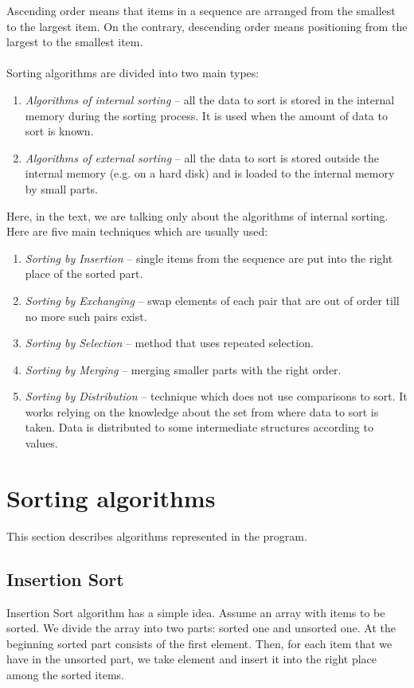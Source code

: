 \documentclass[
  field=inf,
  biblatex,
  language=english,
  glossaries,
  theorems=false,
  sourcecodes=false,
  index
]{kidiplom}
\begin{document}
Ascending order means that items in a sequence are arranged from the smallest to the largest item. On the contrary, descending order means positioning from the largest to the smallest item.
\\\\
Sorting algorithms are divided into two main types:
\begin{enumerate}
	\item \textit{Algorithms of internal sorting} -- all the data to sort is stored in the internal memory during the sorting process. It is used when the amount of data to sort is known.
	\item \textit{Algorithms of external sorting} -- all the data to sort is stored outside the internal memory (e.g. on a hard disk) and is loaded to the internal memory by small parts.
\end{enumerate}

Here, in the text, we are talking only about the algorithms of internal sorting. Here are five main techniques which are usually used\cite{knuth3}:
\begin{enumerate}
	\item \textit{Sorting by Insertion} -- single items from the sequence are put into the right place of the sorted part.
	\item \textit{Sorting by Exchanging} -- swap elements of each pair that are out of order till no more such pairs exist.
	\item \textit{Sorting by Selection} -- method that uses repeated selection.
	\item \textit{Sorting by Merging} -- merging smaller parts with the right order.
	\item \textit{Sorting by Distribution} -- technique which does not use comparisons to sort. It works relying on the knowledge about the set from where data to sort is taken. Data is distributed to some intermediate structures according to values. %
\end{enumerate}

\newpage
\section{Sorting algorithms}

This section describes algorithms represented in the program.

\subsection{Insertion Sort}
\label{sec:insertion}
Insertion Sort algorithm has a simple idea. Assume an array with items to be sorted. We divide the array into two parts: sorted one and unsorted one. At the beginning sorted part consists of the first element. Then, for each item that we have in the unsorted part, we take element and insert it into the right place among the sorted items.
\end{document}
